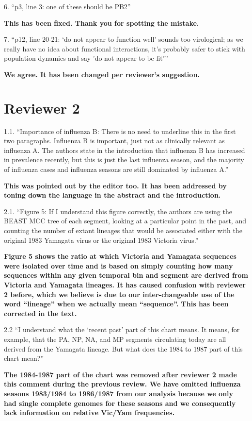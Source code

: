 \documentclass[11pt,oneside,letterpaper]{article}
\begin{document}
6. ``p3, line 3: one of these should be PB2''

\textbf{This has been fixed. Thank you for spotting the mistake.}

7. ``p12, line 20-21: `do not appear to function well' sounds too virological; as we really have no idea about functional interactions, it's probably safer to stick with population dynamics and say 'do not appear to be fit'''

\textbf{We agree. It has been changed per reviewer's suggestion.}

\section*{Reviewer 2}

1.1. ``Importance of influenza B: There is no need to underline this in the first two paragraphs.
Influenza B is important, just not as clinically relevant as influenza A.
The authors state in the introduction that influenza B has increased in prevalence recently, but this is just the last influenza season, and the majority of influenza cases and influenza seasons are still dominated by influenza A.''

\textbf{This was pointed out by the editor too.
It has been addressed by toning down the language in the abstract and the introduction.}

2.1. ``Figure 5: If I understand this figure correctly, the authors are using the BEAST MCC tree of each segment, looking at a particular point in the past, and counting the number of extant lineages that would be associated either with the original 1983 Yamagata virus or the original 1983 Victoria virus.''

\textbf{Figure 5 shows the ratio at which Victoria and Yamagata sequences were isolated over time and is based on simply counting how many sequences within any given temporal bin and segment are derived from Victoria and Yamagata lineages.
It has caused confusion with reviewer 2 before, which we believe is due to our inter-changeable use of the word ``lineage'' when we actually mean ``sequence''.
This has been corrected in the text.}

2.2 ``I understand what the `recent past' part of this chart means.
It means, for example, that the PA, NP, NA, and MP segments circulating today are all derived from the Yamagata lineage.
But what does the 1984 to 1987 part of this chart mean?''

\textbf{The 1984-1987 part of the chart was removed after reviewer 2 made this comment during the previous review.
We have omitted influenza seasons 1983/1984 to 1986/1987 from our analysis because we only had single complete genomes for these seasons and we consequently lack information on relative Vic/Yam frequencies.}
\end{document}

